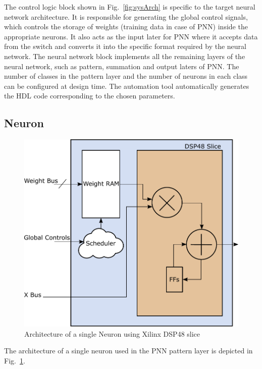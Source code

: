 The control logic block shown in Fig.~\ref{fig:sysArch} is specific to the target neural network architecture.
It is responsible for generating the global control signals, which controls the storage of weights (training data in case of PNN) inside the appropriate neurons.
It also acts as the input later for PNN where it accepts data from the switch and converts it into the specific format required by the neural network.
The neural network block implements all the remaining layers of the neural network, such as pattern, summation and output laters of PNN.
The number of classes in the pattern layer and the number of neurons in each class can be configured at design time.
The automation tool automatically generates the HDL code corresponding to the chosen parameters.

\subsection{Neuron}
\begin{figure}[t]
\centering
   \includegraphics[height=0.5\columnwidth]{Figures/neuron.pdf}
   \caption{Architecture of a single Neuron using Xilinx DSP48 slice}
   \label{fig:neuron}
\end{figure}
The architecture of a single neuron used in the PNN pattern layer is depicted in Fig.~\ref{fig:neuron}.


